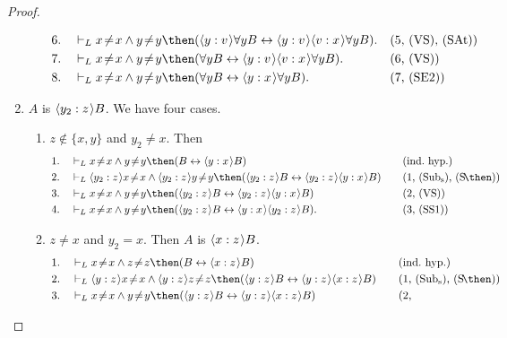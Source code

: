 \documentclass[11pt]{woarticle}
\newcommand{\cmnt}[1]{\iffalse #1 \fi}
\theoremstyle{break}
\theoremstyle{nonumberplain}
\newcommand{\1}{\;\,|\;\,}
\renewcommand{\t}[1]{\ensuremath{\langle #1  \makebox[.2ex]{}\rangle}}
\newcommand{\T}[1]{\ensuremath{(\mathrm{ #1})}}
\begin{document}
\begin{proof}
\begin{enumerate}
\begin{enumerate}
\begin{alignat*}{2}
        6.\quad& \vdash_L x\!\not=\!x \land y\!\not=\!y \then 
          (\t{y:v}\forall y B \leftrightarrow \t{y:v}\t{v:x}\forall y B).
          &&\text{(5, \T{VS}, \T{SAt})}\\
        7.\quad& \vdash_L x\!\not=\!x \land y\!\not=\!y \then 
          (\forall y B \leftrightarrow \t{y:v}\t{v:x}\forall y B).
          &&\text{(6, \T{VS})}\\
        8.\quad& \vdash_L x\!\not=\!x \land y\!\not=\!y \then 
          (\forall y B \leftrightarrow \t{y:x}\forall y B).
          &&\text{(7, \T{SE2})}
      \end{alignat*}
    \end{enumerate}

  \item $A$ is $\t{y_2:z} B$.\; We have four cases.
    \begin{enumerate}
    \item $z \not\in \{x,y\}$ and $y_2 \not= x$.\; Then
      \begin{alignat*}{2}
        1.\quad& \vdash_L x\!\not=\!x \land y\!\not=\!y \then
        (B \leftrightarrow \t{y:x}B) &\quad&\text{(ind.~hyp.)}\\
        2.\quad& \vdash_L \t{y_2:z} x\!\not=\!x \land \t{y_2:z}
        y\!\not=\!y \then (\t{y_2:z} B \leftrightarrow \t{y_2:z} \t{y:x}B)
        &&\text{(1, \T{Sub_s}, \T{S\!\then})}\\
        3.\quad& \vdash_L x\!\not=\!x \land y\!\not=\!y \then
        (\t{y_2:z} B \leftrightarrow \t{y_2:z} \t{y:x}B) &&\text{(2, \T{VS})}\\
        4.\quad& \vdash_L x\!\not=\!x \land y\!\not=\!y \then
        (\t{y_2:z} B \leftrightarrow \t{y:x}\t{y_2:z} B). 
        &&\text{(3, \T{SS1})}
      \end{alignat*}
    \item $z\not=x$ and $y_2=x$.\; Then $A$ is $\t{x:z}B$. \cmnt{(This
        case is surprisingly tough.)}
      \begin{alignat*}{2}
        1.\quad& \vdash_L x\!\not=\!x \land z\!\not=\!z \then (B
        \leftrightarrow \t{x:z}B) &\quad&\text{(ind.~hyp.)}\\
        2.\quad& \vdash_L \t{y:z}x\!\not=\!x \land \t{y:z}z\!\not=\!z
        \then (\t{y:z}B \leftrightarrow \t{y:z}\t{x:z}B)
        &&\text{(1, \T{Sub_s}, \T{S\!\then})}\\
        3.\quad& \vdash_L x\!\not=\!x \land y\!\not=\!y \then
        (\t{y:z}B \leftrightarrow \t{y:z}\t{x:z}B) &&\text{(2,
}
\end{alignat*}
\end{enumerate}
\end{enumerate}
\end{proof}
\end{document}
